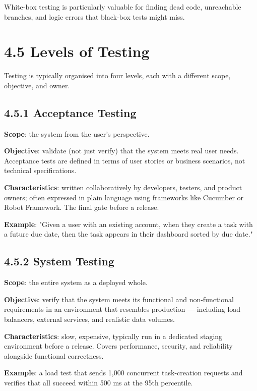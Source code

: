 \documentclass[11pt,a4paper]{book}
\begin{document}
White-box testing is particularly valuable for finding dead code, unreachable branches, and logic errors that black-box tests might miss.

\medskip

\section{4.5 Levels of Testing}

Testing is typically organised into four levels, each with a different scope, objective, and owner.

\subsection{4.5.1 Acceptance Testing}

\textbf{Scope}: the system from the user's perspective.

\textbf{Objective}: validate (not just verify) that the system meets real user needs. Acceptance tests are defined in terms of user stories or business scenarios, not technical specifications.

\textbf{Characteristics}: written collaboratively by developers, testers, and product owners; often expressed in plain language using frameworks like Cucumber or Robot Framework. The final gate before a release.

\textbf{Example}: "Given a user with an existing account, when they create a task with a future due date, then the task appears in their dashboard sorted by due date."

\subsection{4.5.2 System Testing}

\textbf{Scope}: the entire system as a deployed whole.

\textbf{Objective}: verify that the system meets its functional and non-functional requirements in an environment that resembles production --- including load balancers, external services, and realistic data volumes.

\textbf{Characteristics}: slow, expensive, typically run in a dedicated staging environment before a release. Covers performance, security, and reliability alongside functional correctness.

\textbf{Example}: a load test that sends 1,000 concurrent task-creation requests and verifies that all succeed within 500 ms at the 95th percentile.
\end{document}
